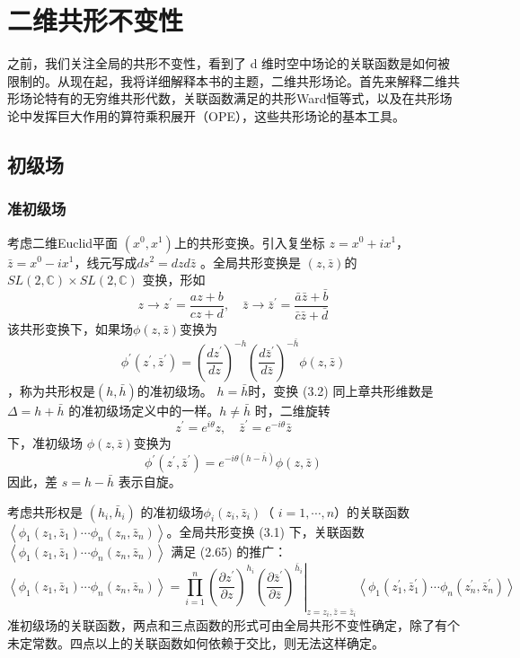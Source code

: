 \chapter{二维共形不变性}

之前，我们关注全局的共形不变性，看到了 d 维时空中场论的关联函数是如何被限制的。从现在起，我将详细解释本书的主题，二维共形场论。首先来解释二维共形场论特有的无穷维共形代数，关联函数满足的共形Ward恒等式，以及在共形场论中发挥巨大作用的算符乘积展开（OPE），这些共形场论的基本工具。

\section{初级场}
\subsection{准初级场}
考虑二维Euclid平面 $(x^0,x^1) $上的共形变换。引入复坐标 $z=x^0+ix^1 $，$ \bar{z}=x^0-ix^1 $，线元写成$ ds^2=dzd\bar{z}$ 。全局共形变换是 $(z,\bar{z}) $的$ S L(2, \mathbb{C}) \times S L(2, \mathbb{C})$ 变换，形如
\begin{equation}
z \rightarrow z^{\prime}=\frac{a z+b}{c z+d}, \quad \bar{z} \rightarrow \bar{z}^{\prime}=\frac{\bar{a} \bar{z}+\bar{b}}{\bar{c} \bar{z}+\bar{d}}
\end{equation}
该共形变换下，如果场$ \phi(z,\bar{z}) $变换为
\begin{equation}
		\phi^{\prime}\left(z^{\prime}, \bar{z}^{\prime}\right)=\left(\frac{d z^{\prime}}{d z}\right)^{-h}\left(\frac{d \bar{z}^{\prime}}{d \bar{z}}\right)^{-\bar{h}} \phi(z, \bar{z})
\end{equation}
，称为共形权是$ (h,\bar{h}) $的准初级场。 $h=\bar{h} $时，变换 (3.2) 同上章共形维数是$ \Delta=h+\bar{h}$ 的准初级场定义中的一样。$ h\neq \bar{h}$ 时，二维旋转
\[
z^{\prime}=e^{i \theta} z, \quad \bar{z}^{\prime}=e^{-i \theta} \bar{z}
\]
下，准初级场 $\phi(z,\bar{z}) $变换为
\[
\phi^{\prime}\left(z^{\prime}, \bar{z}^{\prime}\right)=e^{-i \theta(h-\bar{h})} \phi(z, \bar{z})
\]
因此，差 $s=h-\bar{h}$ 表示自旋。

考虑共形权是 $(h_i,\bar{h}_i)$ 的准初级场$ \phi_i(z_i,\bar{z}_i) $（ $i=1,\cdots,n $）的关联函数 $\left\langle\phi_{1}\left(z_{1}, \bar{z}_{1}\right) \cdots \phi_{n}\left(z_{n}, \bar{z}_{n}\right)\right\rangle $。全局共形变换 (3.1) 下，关联函数 $\left\langle\phi_{1}\left(z_{1}, \bar{z}_{1}\right) \cdots \phi_{n}\left(z_{n}, \bar{z}_{n}\right)\right\rangle$ 满足 (2.65) 的推广：
\begin{equation}
\left\langle\phi_{1}\left(z_{1}, \bar{z}_{1}\right) \cdots \phi_{n}\left(z_{n}, \bar{z}_{n}\right)\right\rangle=\left.\prod_{i=1}^{n}\left(\frac{\partial z^{\prime}}{\partial z}\right)^{h_{i}}\left(\frac{\partial \bar{z}^{\prime}}{\partial \bar{z}}\right)^{\bar{h}_{i}}\right|_{z=z_{i}, \bar{z}=\bar{z}_{i}}\left\langle\phi_{1}\left(z_{1}^{\prime}, \bar{z}_{1}^{\prime}\right) \cdots \phi_{n}\left(z_{n}^{\prime}, \bar{z}_{n}^{\prime}\right)\right\rangle
\end{equation}
准初级场的关联函数，两点和三点函数的形式可由全局共形不变性确定，除了有个未定常数。四点以上的关联函数如何依赖于交比，则无法这样确定。

